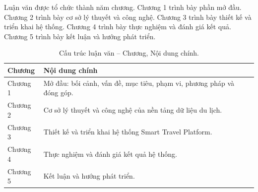 \documentclass[12pt,a4paper]{article}
\begin{document}
Luận văn được tổ chức thành năm chương. Chương 1 trình bày phần mở đầu. Chương 2 trình bày cơ sở lý thuyết và công nghệ. Chương 3 trình bày thiết kế và triển khai hệ thống. Chương 4 trình bày thực nghiệm và đánh giá kết quả. Chương 5 trình bày kết luận và hướng phát triển.

\begin{longtable}{@{}p{}p{}@{}}
\caption{Cấu trúc luận văn -- Chương, Nội dung chính.}\\
\toprule
\textbf{Chương} & \textbf{Nội dung chính} \\
\midrule
Chương 1 & Mở đầu: bối cảnh, vấn đề, mục tiêu, phạm vi, phương pháp và đóng góp. \\
Chương 2 & Cơ sở lý thuyết và công nghệ của nền tảng dữ liệu du lịch. \\
Chương 3 & Thiết kế và triển khai hệ thống Smart Travel Platform. \\
Chương 4 & Thực nghiệm và đánh giá kết quả hệ thống. \\
Chương 5 & Kết luận và hướng phát triển. \\
\bottomrule
\end{longtable}
\end{document}

